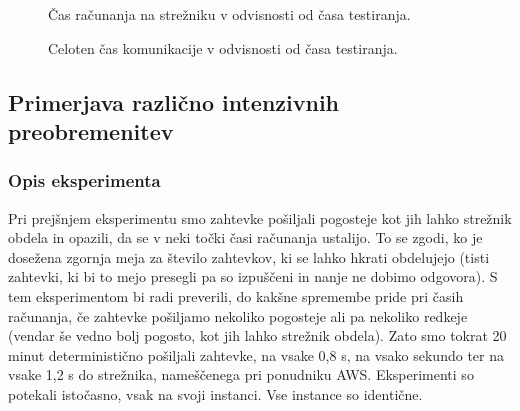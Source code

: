 \begin{figure}[H]
    \caption{Čas računanja na strežniku v odvisnosti od časa testiranja.}
    \label{fig:3_rezultati5_T2}
\end{figure}

\begin{figure}[H]
    \caption{Celoten čas komunikacije v odvisnosti od časa testiranja.}
    \label{fig:3_rezultati5_T1T3}
\end{figure}



\subsection{Primerjava različno intenzivnih preobremenitev}

\subsubsection{Opis eksperimenta}

Pri prejšnjem eksperimentu smo zahtevke pošiljali pogosteje kot jih lahko strežnik obdela in opazili, da se v neki točki časi računanja ustalijo.
To se zgodi, ko je dosežena zgornja meja za število zahtevkov, ki se lahko hkrati obdelujejo (tisti zahtevki, ki bi to mejo presegli pa so izpuščeni in nanje ne dobimo odgovora).
S tem eksperimentom bi radi preverili, do kakšne spremembe pride pri časih računanja, če zahtevke pošiljamo nekoliko pogosteje ali pa nekoliko redkeje (vendar še vedno bolj pogosto, kot jih lahko strežnik obdela).
Zato smo tokrat 20 minut deterministično pošiljali zahtevke, na vsake 0,8 s, na vsako sekundo ter na vsake 1,2 s do strežnika, nameščenega pri ponudniku AWS. Eksperimenti so potekali istočasno, vsak na svoji instanci. Vse instance so identične.

